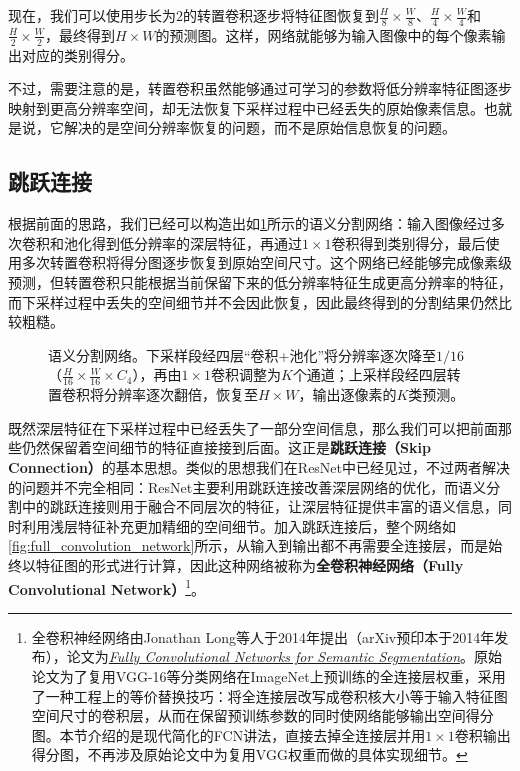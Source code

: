 现在，我们可以使用步长为$2$的转置卷积逐步将特征图恢复到$\frac{H}{8}\times\frac{W}{8}$、$\frac{H}{4}\times\frac{W}{4}$和$\frac{H}{2}\times\frac{W}{2}$，最终得到$H\times W$的预测图。这样，网络就能够为输入图像中的每个像素输出对应的类别得分。

不过，需要注意的是，转置卷积虽然能够通过可学习的参数将低分辨率特征图逐步映射到更高分辨率空间，却无法恢复下采样过程中已经丢失的原始像素信息。也就是说，它解决的是空间分辨率恢复的问题，而不是原始信息恢复的问题。

\subsection{跳跃连接}

根据前面的思路，我们已经可以构造出如\cref{fig:conv_pool_transpose}所示的语义分割网络：输入图像经过多次卷积和池化得到低分辨率的深层特征，再通过$1\times1$卷积得到类别得分，最后使用多次转置卷积将得分图逐步恢复到原始空间尺寸。这个网络已经能够完成像素级预测，但转置卷积只能根据当前保留下来的低分辨率特征生成更高分辨率的特征，而下采样过程中丢失的空间细节并不会因此恢复，因此最终得到的分割结果仍然比较粗糙。

\begin{figure}[H]
    \caption{语义分割网络。下采样段经四层“卷积+池化”将分辨率逐次降至$1/16$（$\tfrac{H}{16}\times\tfrac{W}{16}\times C_4$），再由$1\times 1$卷积调整为$K$个通道；上采样段经四层转置卷积将分辨率逐次翻倍，恢复至$H\times W$，输出逐像素的$K$类预测。}
    \label{fig:conv_pool_transpose}
\end{figure}

既然深层特征在下采样过程中已经丢失了一部分空间信息，那么我们可以把前面那些仍然保留着空间细节的特征直接接到后面。这正是\textbf{跳跃连接（Skip Connection）}的基本思想。类似的思想我们在ResNet中已经见过，不过两者解决的问题并不完全相同：ResNet主要利用跳跃连接改善深层网络的优化，而语义分割中的跳跃连接则用于融合不同层次的特征，让深层特征提供丰富的语义信息，同时利用浅层特征补充更加精细的空间细节。加入跳跃连接后，整个网络如\cref{fig:full_convolution_network}所示，从输入到输出都不再需要全连接层，而是始终以特征图的形式进行计算，因此这种网络被称为\textbf{全卷积神经网络（Fully Convolutional Network）}\footnote{全卷积神经网络由Jonathan Long等人于2014年提出（arXiv预印本于2014年发布），论文为\href{https://openaccess.thecvf.com/content_cvpr_2015/papers/Long_Fully_Convolutional_Networks_2015_CVPR_paper.pdf}{\textit{Fully Convolutional Networks for Semantic Segmentation}}。原始论文为了复用VGG-16等分类网络在ImageNet上预训练的全连接层权重，采用了一种工程上的等价替换技巧：将全连接层改写成卷积核大小等于输入特征图空间尺寸的卷积层，从而在保留预训练参数的同时使网络能够输出空间得分图。本节介绍的是现代简化的FCN讲法，直接去掉全连接层并用$1\times1$卷积输出得分图，不再涉及原始论文中为复用VGG权重而做的具体实现细节。}。

